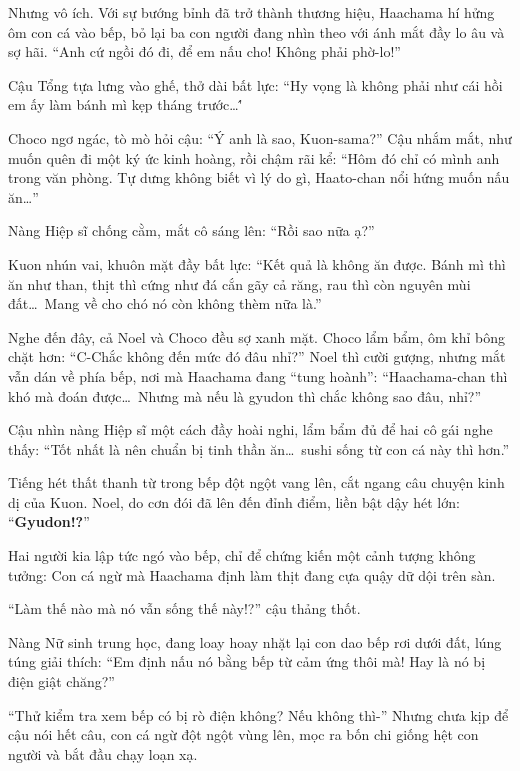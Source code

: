 \documentclass[../main.tex]{subfiles}
\begin{document}
Nhưng vô ích. Với sự bướng bỉnh đã trở thành thương hiệu, Haachama hí hửng ôm con cá vào bếp, bỏ lại ba con người đang nhìn theo với ánh mắt đầy lo âu và sợ hãi. ``Anh cứ ngồi đó đi, để em nấu cho! Không phải phờ-lo!''

Cậu Tổng tựa lưng vào ghế, thở dài bất lực: ``Hy vọng là không phải như cái hồi em ấy làm bánh mì kẹp tháng trước\dots\''

Choco ngơ ngác, tò mò hỏi cậu: ``Ý anh là sao, Kuon-sama?'' Cậu nhắm mắt, như muốn quên đi một ký ức kinh hoàng, rồi chậm rãi kể: ``Hôm đó chỉ có mình anh trong văn phòng. Tự dưng không biết vì lý do gì, Haato-chan nổi hứng muốn nấu ăn\dots''

Nàng Hiệp sĩ chống cằm, mắt cô sáng lên: ``Rồi sao nữa ạ?''

Kuon nhún vai, khuôn mặt đầy bất lực: ``Kết quả là không ăn được. Bánh mì thì ăn như than, thịt thì cứng như đá cắn gãy cả răng, rau thì còn nguyên mùi đất\dots\ Mang về cho chó nó còn không thèm nữa là.''

Nghe đến đây, cả Noel và Choco đều sợ xanh mặt. Choco lẩm bẩm, ôm khỉ bông chặt hơn: ``C-Chắc không đến mức đó đâu nhỉ?'' Noel thì cười gượng, nhưng mắt vẫn dán về phía bếp, nơi mà Haachama đang ``tung hoành'': ``Haachama-chan thì khó mà đoán được\dots\ Nhưng mà nếu là gyudon thì chắc không sao đâu, nhỉ?''

Cậu nhìn nàng Hiệp sĩ một cách đầy hoài nghi, lẩm bẩm đủ để hai cô gái nghe thấy: ``Tốt nhất là nên chuẩn bị tinh thần ăn\dots\ sushi sống từ con cá này thì hơn.''

Tiếng hét thất thanh từ trong bếp đột ngột vang lên, cắt ngang câu chuyện kinh dị của Kuon. Noel, do cơn đói đã lên đến đỉnh điểm, liền bật dậy hét lớn: ``\textbf{Gyudon!?}''

Hai người kia lập tức ngó vào bếp, chỉ để chứng kiến một cảnh tượng không tưởng: Con cá ngừ mà Haachama định làm thịt đang cựa quậy dữ dội trên sàn.


``Làm thế nào mà nó vẫn sống thế này!?'' cậu thảng thốt.

Nàng Nữ sinh trung học, đang loay hoay nhặt lại con dao bếp rơi dưới đất, lúng túng giải thích: ``Em định nấu nó bằng bếp từ cảm ứng thôi mà! Hay là nó bị điện giật chăng?''

``Thử kiểm tra xem bếp có bị rò điện không? Nếu không thì-'' Nhưng chưa kịp để cậu nói hết câu, con cá ngừ đột ngột vùng lên, mọc ra bốn chi giống hệt con người và bắt đầu chạy loạn xạ.
\end{document}

